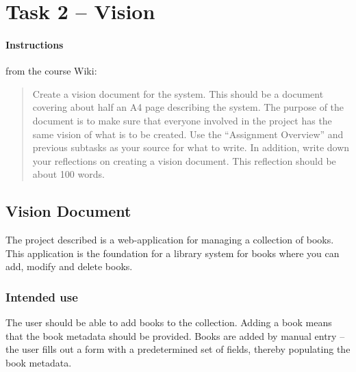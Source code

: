 %
%
%
%


\section{Task 2 -- Vision}\label{task-2}

\paragraph{Instructions}\label{task-2-instructions}
from the course Wiki\cite{1dv600:lab1:instructions}:

\begin{quote}
  Create a vision document for the system. This should be a document covering
  about half an A4 page describing the system. The purpose of the document is
  to make sure that everyone involved in the project has the same vision of
  what is to be created. Use the ``Assignment Overview'' and previous subtasks
  as your source for what to write. In addition, write down your reflections on
  creating a vision document. This reflection should be about 100 words.
\end{quote}


\subsection{Vision Document}\label{task-2-vision}
The project described is a web-application for managing a collection of books.
This application is the foundation for a library system for books where you can
add, modify and delete books.


\subsubsection{Intended use}
The user should be able to add books to the collection.
Adding a book means that the book metadata should be provided.
Books are added by manual entry -- the user fills out a form with a
predetermined set of fields, thereby populating the book metadata.

